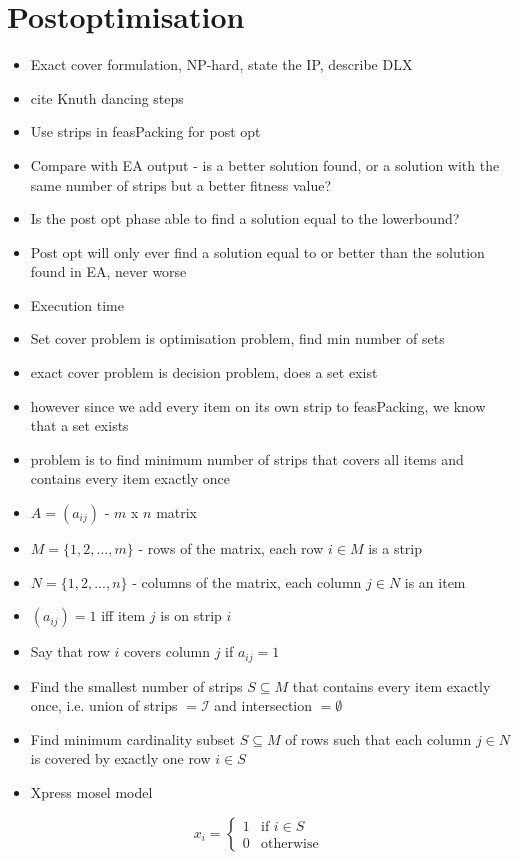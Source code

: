 \documentclass{elsarticle}
\begin{document}
\section{Postoptimisation}
\label{sec:postopt}
\begin{itemize}
	\item Exact cover formulation, NP-hard, state the IP, describe DLX
	\item cite Knuth \cite{knuth2000} dancing steps
	\item Use strips in feasPacking for post opt
	\item Compare with EA output - is a better solution found, or a solution with the same number of strips but a better fitness value?
	\item Is the post opt phase able to find a solution equal to the lowerbound?
	\item Post opt will only ever find a solution equal to or better than the solution found in EA, never worse
	\item Execution time
	\item Set cover problem is optimisation problem, find min number of sets
	\item exact cover problem is decision problem, does a set exist
	\item however since we add every item on its own strip to feasPacking, we know that a set exists
	\item problem is to find minimum number of strips that covers all items and contains every item exactly once
	\item $A = (a_{ij})$ - $m$ x $n$ matrix
	\item $M = \{1, 2,..., m\}$ - rows of the matrix, each row $i \in M$ is a strip
	\item $N = \{1, 2,...,n\}$ - columns of the matrix, each column $j \in N$ is an item
	\item $(a_{ij}) = 1$ iff item $j$ is on strip $i$
	\item Say that row $i$ covers column $j$ if $a_{ij} = 1$
	\item Find the smallest number of strips $S \subseteq M$ that contains every item exactly once, i.e. union of strips $= \mathcal{I}$ and intersection $= \emptyset$
	\item Find minimum cardinality subset $S \subseteq M$ of rows such that each column $j \in N$ is covered by exactly one row $i \in S$
	\item Xpress mosel model
\end{itemize}
\[x_i =
\begin{cases} 
1 & \text{if } i \in S \\
0 & \text{otherwise} 
\end{cases}
\]
\end{document}
